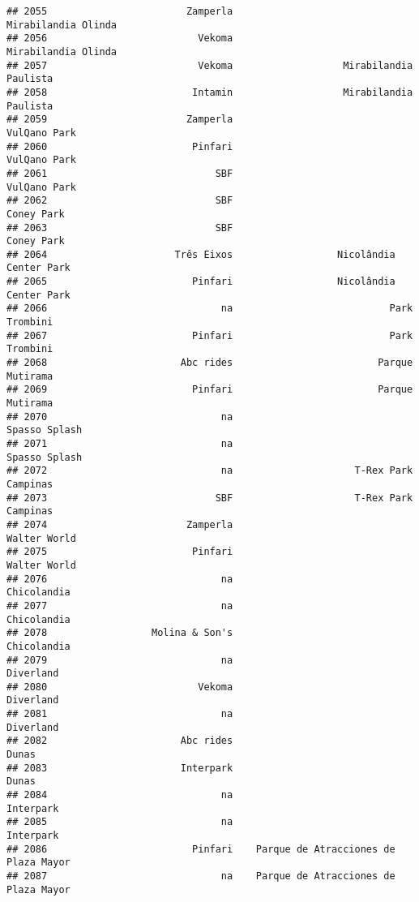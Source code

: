 \documentclass[
]{article}
\begin{document}
\begin{verbatim}
## 2055                        Zamperla                     Mirabilandia Olinda
## 2056                          Vekoma                     Mirabilandia Olinda
## 2057                          Vekoma                   Mirabilandia Paulista
## 2058                         Intamin                   Mirabilandia Paulista
## 2059                        Zamperla                            VulQano Park
## 2060                         Pinfari                            VulQano Park
## 2061                             SBF                            VulQano Park
## 2062                             SBF                              Coney Park
## 2063                             SBF                              Coney Park
## 2064                      Três Eixos                  Nicolândia Center Park
## 2065                         Pinfari                  Nicolândia Center Park
## 2066                              na                           Park Trombini
## 2067                         Pinfari                           Park Trombini
## 2068                       Abc rides                         Parque Mutirama
## 2069                         Pinfari                         Parque Mutirama
## 2070                              na                           Spasso Splash
## 2071                              na                           Spasso Splash
## 2072                              na                     T-Rex Park Campinas
## 2073                             SBF                     T-Rex Park Campinas
## 2074                        Zamperla                            Walter World
## 2075                         Pinfari                            Walter World
## 2076                              na                             Chicolandia
## 2077                              na                             Chicolandia
## 2078                  Molina & Son's                             Chicolandia
## 2079                              na                               Diverland
## 2080                          Vekoma                               Diverland
## 2081                              na                               Diverland
## 2082                       Abc rides                                   Dunas
## 2083                       Interpark                                   Dunas
## 2084                              na                               Interpark
## 2085                              na                               Interpark
## 2086                         Pinfari    Parque de Atracciones de Plaza Mayor
## 2087                              na    Parque de Atracciones de Plaza Mayor

\end{verbatim}
\end{document}
